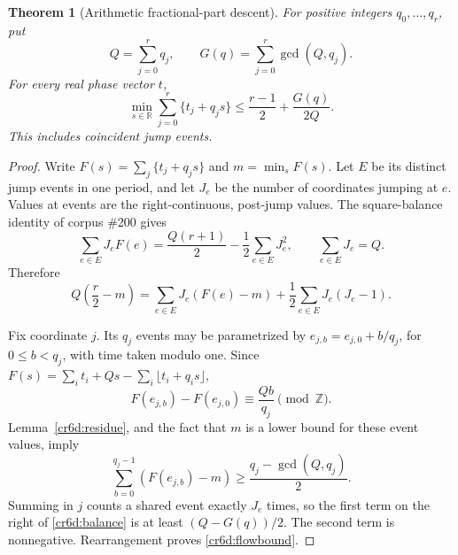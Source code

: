 \documentclass[11pt,a4paper]{article}
\newtheorem{theorem}{Theorem}[section]
\theoremstyle{remark}\newtheorem{remark}[theorem]{Remark}
\begin{document}
\begin{theorem}[Arithmetic fractional-part descent]\label{cr6d:flow}
For positive integers $q_0,\ldots,q_r$, put
\[
 Q=\sum_{j=0}^r q_j,\qquad
 G(q)=\sum_{j=0}^r\gcd(Q,q_j).
\]
For every real phase vector $t$,
\begin{equation}\label{cr6d:flowbound}
 \min_{s\in\mathbb R}\sum_{j=0}^r\{t_j+q_js\}
 \le \frac{r-1}{2}+\frac{G(q)}{2Q}.
\end{equation}
This includes coincident jump events.
\end{theorem}
\begin{proof}
Write $F(s)=\sum_j\{t_j+q_js\}$ and $m=\min_sF(s)$.
Let $E$ be its distinct jump events in one period, and let
$J_e$ be the number of coordinates jumping at $e$.  Values at
events are the right-continuous, post-jump values.
The square-balance identity of corpus \#200 gives
\[
 \sum_{e\in E}J_eF(e)
 =\frac{Q(r+1)}2-\frac12\sum_{e\in E}J_e^2,
 \qquad \sum_{e\in E}J_e=Q.
\]
Therefore
\begin{equation}\label{cr6d:balance}
 Q\left(\frac r2-m\right)
 =\sum_{e\in E}J_e(F(e)-m)
   +\frac12\sum_{e\in E}J_e(J_e-1).
\end{equation}

Fix coordinate $j$.  Its $q_j$ events may be parametrized by
$e_{j,b}=e_{j,0}+b/q_j$, for $0\le b<q_j$, with time taken
modulo one.  Since
$F(s)=\sum_i t_i+Qs-\sum_i\lfloor t_i+q_is\rfloor$,
\[
 F(e_{j,b})-F(e_{j,0})\equiv\frac{Qb}{q_j}\pmod{\mathbb Z}.
\]
Lemma~\ref{cr6d:residue}, and the fact that $m$ is a lower
bound for these event values, imply
\[
 \sum_{b=0}^{q_j-1}(F(e_{j,b})-m)
 \ge\frac{q_j-\gcd(Q,q_j)}2.
\]
Summing in $j$ counts a shared event exactly $J_e$ times, so
the first term on the right of \eqref{cr6d:balance} is at least
$(Q-G(q))/2$.  The second term is nonnegative.  Rearrangement
proves \eqref{cr6d:flowbound}.
\end{proof}
\end{document}
